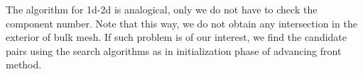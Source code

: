 \documentclass{elsarticle}
\newcommand{\notePE}[1]{{\color{Orange} \textbf{PE: } \textit{#1}}}
\begin{document}
The algorithm for 1d-2d is analogical, only we do not have to check the component number.
Note that this way, we do not obtain any intersection in the exterior of bulk mesh.
If such problem is of our interest, we find the candidate pairs using the search algorithms as in
initialization phase of advancing front method.






\end{document}

